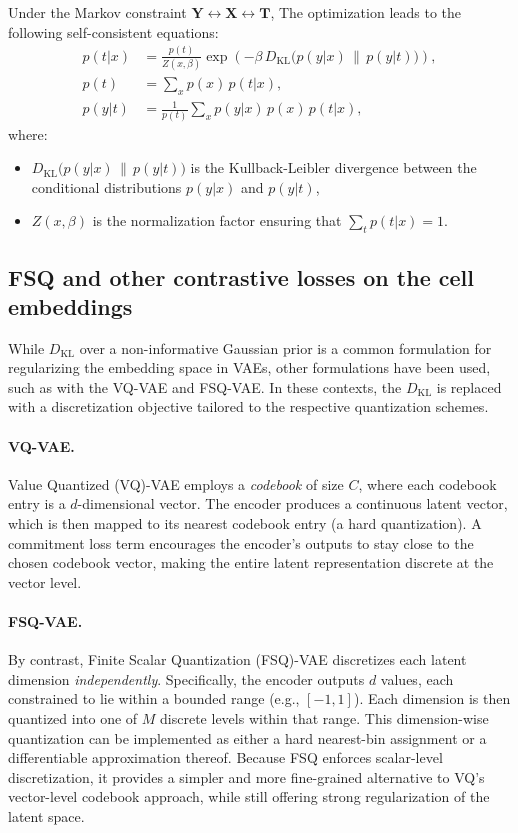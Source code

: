 Under the Markov constraint
\(\mathbf{Y} \leftrightarrow \mathbf{X} \leftrightarrow \mathbf{T}\),
The optimization leads to the following self-consistent equations:
\begin{align}
p(t|x) &= \frac{p(t)}{Z(x,\beta)} \exp\left(-\beta\, D_{\mathrm{KL}}\bigl(p(y|x) \,\|\, p(y|t)\bigr)\right), \label{eq:ib_ptx} \\
p(t) &= \sum_{x} p(x)\, p(t|x), \label{eq:ib_pt} \\
p(y|t) &= \frac{1}{p(t)} \sum_{x} p(y|x)\, p(x)\, p(t|x), \label{eq:ib_pyt}
\end{align}
where:
\begin{itemize}
   \item \( D_{\mathrm{KL}}\bigl(p(y|x) \,\|\, p(y|t)\bigr) \) is the Kullback-Leibler divergence between the conditional distributions \( p(y|x) \) and \( p(y|t) \),
   \item \( Z(x,\beta) \) is the normalization factor ensuring that \( \sum_t p(t|x) = 1 \).
\end{itemize}

\subsection{FSQ and other contrastive losses on the cell embeddings}
\label{sec:otherlosses}
While \(D_{\mathrm{KL}}\) over a non-informative Gaussian prior is a common formulation for regularizing the embedding space in \gls{VAE}s, other formulations have been used, such as with the \gls{VQ-VAE} and \gls{FSQ-VAE}. In these contexts, the \(D_{\mathrm{KL}}\) is replaced with a discretization objective tailored to the respective quantization schemes.

\paragraph{VQ-VAE.}
Value Quantized (VQ)-VAE employs a \emph{codebook} of size \(C\), where each codebook entry is a \(d\)-dimensional vector. The encoder produces a continuous latent vector, which is then mapped to its nearest codebook entry (a hard quantization). A commitment loss term encourages the encoder's outputs to stay close to the chosen codebook vector, making the entire latent representation discrete at the vector level.

\paragraph{FSQ-VAE.}
By contrast, Finite Scalar Quantization (FSQ)-VAE discretizes each latent dimension \emph{independently}. Specifically, the encoder outputs \(d\) values, each constrained to lie within a bounded range (e.g., \([-1, 1]\)). Each dimension is then quantized into one of \(M\) discrete levels within that range. This dimension-wise quantization can be implemented as either a hard nearest-bin assignment or a differentiable approximation thereof. Because \gls{FSQ} enforces scalar-level discretization, it provides a simpler and more fine-grained alternative to VQ's vector-level codebook approach, while still offering strong regularization of the latent space.

